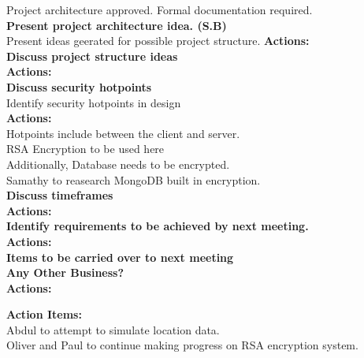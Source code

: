 \documentclass[a4wide,10pt]{extarticle}
\begin{document}
{Project architecture approved.
Formal documentation required.\\
\hfill \break
\hfill \break
\hfill \break
\hfill \break
{\large \textbf{Present project architecture idea. (S.B)\\}}
Present ideas geerated for possible project structure.
\textbf{Actions:\\}
\hfill \break
\hfill \break
\hfill \break
\hfill \break
{\large \textbf{Discuss project structure ideas\\}}
\textbf{Actions:\\}
\hfill \break
\hfill \break
{\large \textbf{Discuss security hotpoints\\}}
Identify security hotpoints in design\\
\textbf{Actions:\\}
Hotpoints include between the client and server.\\
RSA Encryption to be used here\\
Additionally, Database needs to be encrypted. \\
Samathy to reasearch MongoDB built in encryption.\\
\hfill \break
\hfill \break
\hfill \break
\hfill \break
{\large \textbf{Discuss timeframes\\}}
\textbf{Actions:\\}
\hfill \break
\hfill \break
\hfill \break
\hfill \break
{\large \textbf{Identify requirements to be achieved by next meeting.\\}}
\textbf{Actions:\\}
\hfill \break
\hfill \break
\hfill \break
\hfill \break
{\large \textbf{Items to be carried over to next meeting\\}}
\hfill \break
\hfill \break
\hfill \break
\hfill \break
\hfill \break
{\large \textbf{Any Other Business?\\}}
\textbf{Actions:\\}
\hfill \break
\hfill \break
\hfill \break
\hfill \break
\hfill \break

{\large \textbf{Action Items:\\}}
Abdul to attempt to simulate location data.\\
Oliver and Paul to continue making progress on RSA encryption system.\\
\hfill \break
\hfill \break
\hfill \break
\hfill \break
\hfill \break



\subsection*{\color{red}{Next Meeting: Thursday March 10th}}

}
\end{document}
